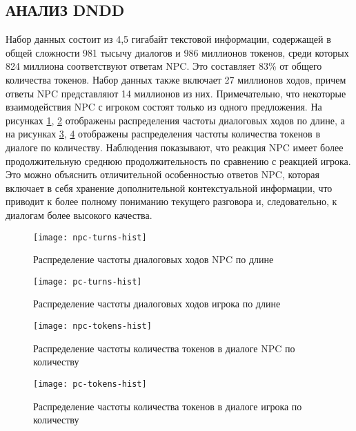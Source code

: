 \subsection{АНАЛИЗ DNDD}
Набор данных состоит из 4,5 гигабайт текстовой информации, содержащей в общей сложности 981 тысычу диалогов и 986 миллионов токенов, среди которых 824 миллиона соответствуют ответам NPC. Это составляет 83\% от общего количества токенов. Набор данных также включает 27 миллионов ходов, причем ответы NPC представляют 14 миллионов из них. Примечательно, что некоторые взаимодействия NPC с игроком состоят только из одного предложения. На рисунках \ref{fig:npc-turns-hist}, \ref{fig:pc-turns-hist} отображены распределения частоты диалоговых ходов по длине, а на рисунках \ref{fig:npc-tokens-hist}, \ref{fig:pc-tokens-hist} отображены распределения частоты количества токенов в диалоге по количеству. Наблюдения показывают, что реакция NPC имеет более продолжительную среднюю продолжительность по сравнению с реакцией игрока. Это можно объяснить отличительной особенностью ответов NPC, которая включает в себя хранение дополнительной контекстуальной информации, что приводит к более полному пониманию текущего разговора и, следовательно, к диалогам более высокого качества.

\begin{figure}[H]
      \centering
      \texttt{[image: npc-turns-hist]}
      \caption{Распределение частоты диалоговых ходов NPC по длине}
      \label{fig:npc-turns-hist}
\end{figure}
\begin{figure}[H]
      \centering
      \texttt{[image: pc-turns-hist]}
      \caption{Распределение частоты диалоговых ходов игрока по длине}
      \label{fig:pc-turns-hist}
\end{figure}

\begin{figure}[H]
      \centering
      \texttt{[image: npc-tokens-hist]}
      \caption{Распределение частоты количества токенов в диалоге NPC по количеству}
      \label{fig:npc-tokens-hist}
\end{figure}

\begin{figure}[H]
      \centering
      \texttt{[image: pc-tokens-hist]}
      \caption{Распределение частоты количества токенов в диалоге игрока по количеству}
      \label{fig:pc-tokens-hist}
\end{figure}

